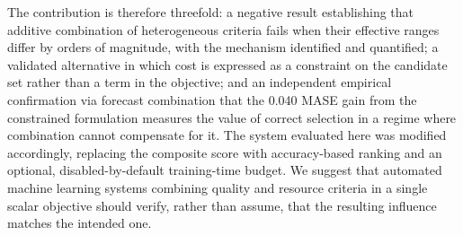 The contribution is therefore threefold: a negative result establishing that additive combination of heterogeneous criteria fails when their effective ranges differ by orders of magnitude, with the mechanism identified and quantified; a validated alternative in which cost is expressed as a constraint on the candidate set rather than a term in the objective; and an independent empirical confirmation via forecast combination that the 0.040 MASE gain from the constrained formulation measures the value of correct selection in a regime where combination cannot compensate for it. The system evaluated here was modified accordingly, replacing the composite score with accuracy-based ranking and an optional, disabled-by-default training-time budget. We suggest that automated machine learning systems combining quality and resource criteria in a single scalar objective should verify, rather than assume, that the resulting influence matches the intended one.
